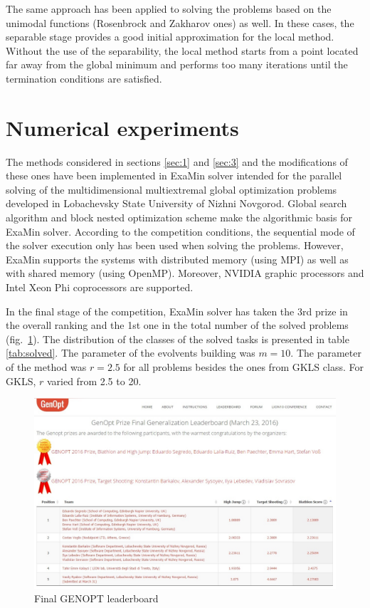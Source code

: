 \documentclass{llncs}
\begin{document}
The same approach has been applied to solving the problems based on the unimodal functions (Rosenbrock and Zakharov ones) as well. In these cases, the separable stage provides a good initial approximation for the local method. Without the use of the separability, the local method starts from a point located far away from the global minimum and performs too many iterations until the termination conditions are satisfied. 

\section{Numerical experiments}\label{sec:5}

The methods considered in sections \ref{sec:1} and \ref{sec:3} and the modifications of these ones have been implemented in ExaMin solver intended for the parallel solving of the multidimensional multiextremal global optimization problems developed in Lobachevsky State University of Nizhni Novgorod. Global search algorithm and block nested optimization scheme \cite{Barkalov2014} make the algorithmic basis for ExaMin solver. According to the competition conditions, the sequential mode of the solver execution only has been used when solving the problems. However, ExaMin supports the systems with distributed memory (using MPI) as well as with shared memory (using OpenMP). Moreover, NVIDIA graphic processors and Intel Xeon Phi coprocessors are supported.

In the final stage of the competition, ExaMin solver has taken the 3rd prize in the overall ranking and the 1st one in the total number of the solved problems (fig.~\ref{fig:4}). The distribution of the classes of the solved tasks is presented in table \ref{tab:solved}. The parameter of the evolvents building was $m=10$. The parameter of the method was $r=2.5$ for all problems besides the ones from GKLS class. For GKLS, $r$ varied from 2.5 to 20.

\begin{figure}
	\center
  \includegraphics[width=1.00\textwidth]{fig4.jpg} 
  \caption{Final GENOPT leaderboard}
  \label{fig:4}       %
\end{figure} 
\end{document}
